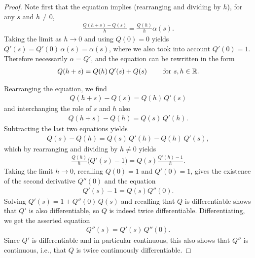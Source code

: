 \begin{proof}
  Note first that the equation implies (rearranging and dividing by $h$),
  for any $s$ and $h \ne 0$,
  \begin{align*}
    \frac{Q(h+s) - Q(s)}{h} = \frac{Q(h)}{h} \alpha(s) .
  \end{align*}
  Taking the limit as $h \to 0$ and using $Q(0)=0$ yields
  $Q'(s) = Q'(0) \, \alpha(s) = \alpha(s)$, where we also
  took into account $Q'(0) = 1$. Therefore necessarily
  $\alpha = Q'$, and the equation can be rewritten in the form
  \begin{align*}
  Q(h+s) = Q(h) \, Q'(s) + Q(s) \qquad \text{ for } s,h \in \mathbb{R} .
  \end{align*}

  Rearranging the equation, we find
  \begin{align*}
    Q(h+s) - Q(s) = Q(h) \, Q'(s)
  \end{align*}
  and interchanging the role of $s$ and $h$ also
  \begin{align*}
    Q(h+s) - Q(h) = Q(s) \, Q'(h) .
  \end{align*}
  Subtracting the last two equations yields
  \begin{align*}
    Q(s) - Q(h) = Q(s) \, Q'(h) - Q(h) \, Q'(s) ,
  \end{align*}
  which by rearranging and dividing by $h \ne 0$ yields
  \begin{align*}
     \frac{Q(h)}{h} \big( Q'(s) - 1 \big) = Q(s) \frac{Q'(h) - 1}{h} .
  \end{align*}
  Taking the limit $h \to 0$, recalling $Q(0)=1$ and $Q'(0)=1$,
  gives the existence of the second derivative $Q''(0)$ and the equation
  \begin{align*}
    Q'(s) - 1 = Q(s) Q''(0) .
  \end{align*}
  Solving $Q'(s) = 1 + Q''(0) \, Q(s)$ and recalling that $Q$
  is differentiable shows that $Q'$ is also differentiable, so
  $Q$ is indeed twice differentiable. Differentiating, we get
  the asserted equation
  \begin{align*}
    Q''(s) = Q'(s) \, Q''(0) .
  \end{align*}
  Since $Q'$ is differentiable and in particular continuous, this also shows
  that $Q''$ is continuous, i.e., that $Q$ is twice continuously differentiable.
\end{proof}

